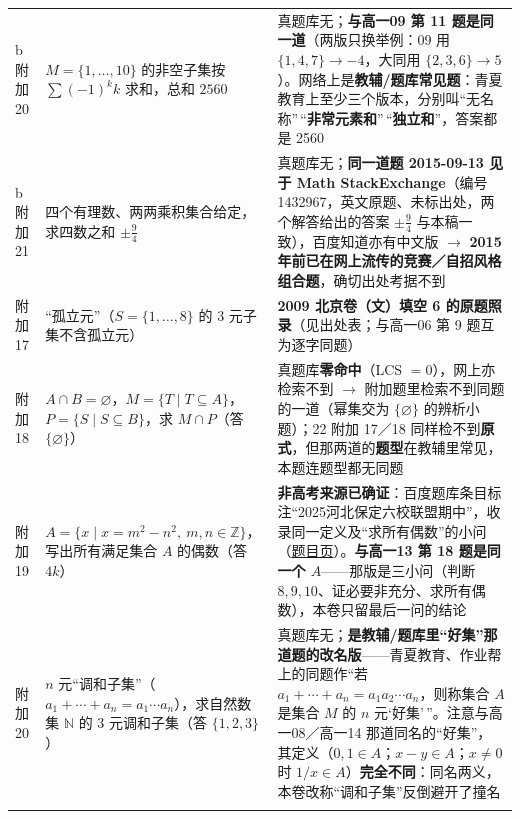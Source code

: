 \documentclass[a4paper,11pt]{article}
\begin{document}
\begin{xltabular}{\textwidth}{@{}>{\raggedright\arraybackslash}p{2.01cm}>{\raggedright\arraybackslash}p{4.95cm}>{\raggedright\arraybackslash}p{7.78cm}@{}}
b 附加 20 & \(M=\allowbreak \{1,\allowbreak \dots,\allowbreak 10\}\) 的非空子集按 \(\sum(-1)^kk\) 求和，总和 \(2560\) & 真题库无；\textbf{与高一09 第 11 题是同一道}（两版只换举例：09 用 \(\{1,\allowbreak 4,\allowbreak 7\}\to\allowbreak -4\)，大同用 \(\{2,\allowbreak 3,\allowbreak 6\}\to\allowbreak 5\)）。网络上是\textbf{教辅/题库常见题}：青夏教育上至少三个版本，分别叫``无名称''\,``\textbf{非常元素和}''\,``\textbf{独立和}''，答案都是 2560 \\ \addlinespace[1pt]
b 附加 21 & 四个有理数、两两乘积集合给定，求四数之和 \(\pm\frac94\) & 真题库无；\textbf{同一道题 2015-09-13 见于 Math StackExchange}（编号 1432967，英文原题、未标出处，两个解答给出的答案 \(\pm\frac94\) 与本稿一致），百度知道亦有中文版 $\to$ \textbf{2015 年前已在网上流传的竞赛／自招风格组合题}，确切出处考据不到 \\  附加 17 & ``孤立元''（\(S=\allowbreak \{1,\allowbreak \dots,\allowbreak 8\}\) 的 3 元子集不含孤立元） & \textbf{2009 北京卷（文）填空 6 的原题照录}（见出处表；与高一06 第 9 题互为逐字同题） \\  附加 18 & \(A\cap\allowbreak  B=\allowbreak \varnothing\)，\(M=\allowbreak \{T\mid\allowbreak  T\subseteq\allowbreak  A\}\)，\(P=\allowbreak \{S\mid\allowbreak  S\subseteq\allowbreak  B\}\)，求 \(M\cap\allowbreak  P\)（答 \(\{\varnothing\}\)） & 真题库\textbf{零命中}（LCS \(=\allowbreak 0\)），网上亦检索不到 $\to$ 附加题里检索不到同题的一道（幂集交为 \(\{\varnothing\}\) 的辨析小题）；22 附加 17／18 同样检不到\textbf{原式}，但那两道的\textbf{题型}在教辅里常见，本题连题型都无同题 \\  附加 19 & \(A=\allowbreak \{x\mid\allowbreak  x=m^2-n^2,\allowbreak \ m,n\in\mathbb{Z}\}\)，写出所有满足集合 \(A\) 的偶数（答 \(4k\)） & \textbf{非高考来源已确证}：百度题库条目标注``2025河北保定六校联盟期中''，收录同一定义及``求所有偶数''的小问（\href{https://easylearn.baidu.com/edu-page/tiangong/questiondetail?id=1859263460622209243}{题目页}）。\textbf{与高一13 第 18 题是同一个 \(A\)}------那版是三小问（判断 \(8,\allowbreak 9,\allowbreak 10\)、证必要非充分、求所有偶数），本卷只留最后一问的结论 \\  附加 20 & \(n\) 元``调和子集''（\(a_1+\allowbreak \cdots+a_n=a_1\cdots a_n\)），求自然数集 \(\mathbb{N}\) 的 3 元调和子集（答 \(\{1,\allowbreak 2,\allowbreak 3\}\)） & 真题库无；\textbf{是教辅/题库里``好集''那道题的改名版}------青夏教育、作业帮上的同题作``若 \(a_1+\allowbreak \cdots+a_n=a_1a_2\cdots a_n\)，则称集合 \(A\) 是集合 \(M\) 的 \(n\) 元`好集'\,''。注意与高一08／高一14 那道同名的``好集''，其定义（\(0,\allowbreak 1\in A\)；\(x-y\in A\)；\(x\neq0\) 时 \(1/x\in A\)）\textbf{完全不同}：同名两义，本卷改称``调和子集''反倒避开了撞名 \\ \addlinespace[1pt]

\end{xltabular}
\end{document}
